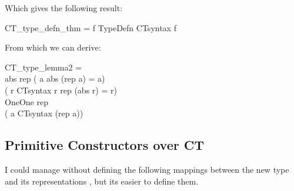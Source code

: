 Which gives the following result:
\begin{GFT}{}
\+\PrNL{}CT\_type\_defn\_thm\PrNN{} = \MMM{\Zthm} \MMM{\exists} f\MMM{\bullet} TypeDefn CTsyntax f\\
\end{GFT}

From which we can derive:

\begin{GFT}{}
\+\PrNL{}CT\_type\_lemma2\PrNN{} =\\
\+	\MMM{\Zthm} \MMM{\exists} abs rep\MMM{\bullet} (\MMM{\forall} a\MMM{\bullet} abs (rep a) = a)\\
\+         \MMM{\land} (\MMM{\forall} r\MMM{\bullet} CTsyntax r \MMM{\Leftrightarrow} rep (abs r) = r)\\
\+         \MMM{\land} OneOne rep\\
\+         \MMM{\land} (\MMM{\forall} a\MMM{\bullet} CTsyntax (rep a))\\
\end{GFT}


\subsection{Primitive Constructors over CT}

I could manage without defining the following mappings between the new type and its representations , but its easier to define them.


